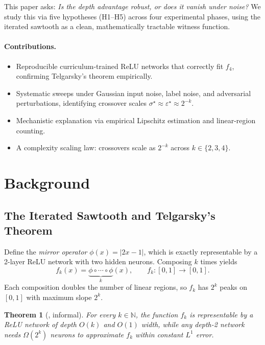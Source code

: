 \documentclass[10pt,twocolumn]{article}
\newtheorem{theorem}{Theorem}
\newcommand{\epst}{\varepsilon^\star}
\newcommand{\sigt}{\sigma^\star}
\begin{document}
This paper asks: \emph{Is the depth advantage robust, or does it vanish under noise?}
We study this via five hypotheses (H1–H5) across four experimental phases, using the
iterated sawtooth as a clean, mathematically tractable witness function.

\paragraph{Contributions.}
\begin{itemize}
  \item Reproducible curriculum-trained ReLU networks that correctly fit $f_4$,
        confirming Telgarsky's theorem empirically.
  \item Systematic sweeps under Gaussian input noise, label noise, and adversarial
        perturbations, identifying crossover scales $\sigt \approx \epst \approx 2^{-k}$.
  \item Mechanistic explanation via empirical Lipschitz estimation and linear-region counting.
  \item A complexity scaling law: crossovers scale as $2^{-k}$ across $k\in\{2,3,4\}$.
\end{itemize}

\section{Background}
\label{sec:background}

\subsection{The Iterated Sawtooth and Telgarsky's Theorem}

Define the \emph{mirror operator} $\phi(x) = |2x - 1|$, which is exactly representable
by a 2-layer ReLU network with two hidden neurons. Composing $k$ times yields
\begin{equation}
  f_k(x) = \underbrace{\phi \circ \cdots \circ \phi}_{k}(x),
  \qquad f_k : [0,1] \to [0,1].
\end{equation}
Each composition doubles the number of linear regions, so $f_k$ has $2^k$ peaks on $[0,1]$
with maximum slope $2^k$.

\begin{theorem}[\citealt{telgarsky2016benefits}, informal]
  For every $k \in \mathbb{N}$, the function $f_k$ is representable by a ReLU network
  of depth $O(k)$ and $O(1)$ width, while any depth-2 network needs $\Omega(2^k)$ neurons
  to approximate $f_k$ within constant $L^1$ error.
\end{theorem}
\end{document}
